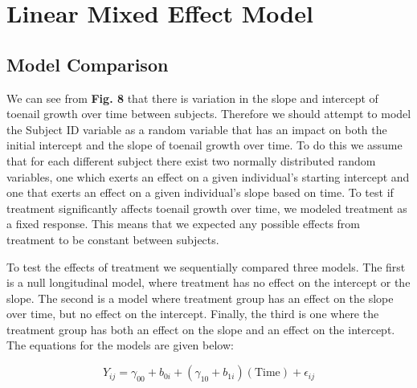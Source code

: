 \documentclass{article}
\begin{document}
\section*{Linear Mixed Effect Model}
\subsection*{Model Comparison}
 We can see from \textbf{Fig. 8} that there is variation in the slope and intercept of toenail growth over time between subjects. Therefore we should attempt to model the Subject ID variable as a random variable that has an impact on both the initial intercept and the slope of toenail growth over time. To do this we assume that for each different subject there exist two normally distributed random variables, one which exerts an effect on a given individual's starting intercept and one that exerts an effect on a given individual's slope based on time. To test if treatment significantly affects toenail growth over time, we modeled treatment as a fixed response. This means that we expected any possible effects from treatment to be constant between subjects.

To test the effects of treatment we sequentially compared three models. The first is a null longitudinal model, where treatment has no effect on the intercept or the slope. The second is a model where treatment group has an effect on the slope over time, but no effect on the intercept. Finally, the third is one where the treatment group has both an effect on the slope and an effect on the intercept. The equations for the models are given below:


\begin{equation}
    Y_{ij} = \gamma_{00}+b_{0i}+(\gamma_{10}+b_{1i})(\textrm{Time}) + \epsilon_{ij}
\end{equation}
\end{document}
